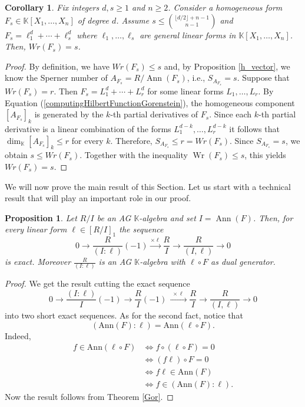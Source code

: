 \documentclass[12pt,twoside]{amsart}
\numberwithin{equation}{section} \hyphenation{semi-stable}
\newcommand{\K}{\mathbb{K}}
\DeclareMathOperator{\ann}{Ann}
\newtheorem{corollary}[theorem]{Corollary}
\newtheorem{proposition}[theorem]{Proposition}
\theoremstyle{definition}
\begin{document}
\begin{corollary} Fix integers $d,s\ge 1$ and $n\ge 2$. Consider a homogeneous form $F_s\in \K[X_1,\ldots ,X_n]$ of degree $d$. Assume $s\le {\lfloor d/2 \rfloor+n-1\choose n-1}$ and  $F_s=\ell_1^d+\cdots +\ell_s^d$ where $\ell_1, \ldots ,\ell_s$ are general linear forms in $\K[X_1,\ldots ,X_n]$. Then,  
    $Wr(F_s)=s$.
\end{corollary}
\begin{proof}  By definition,  we  have $Wr(F_{s}) \le s$ and, by Proposition \ref{h_vector}, we know the Sperner number of $A_{F_s}=R/\ann(F_s)$, i.e., $S_{A_{F_s}}=s$.  Suppose that $W r\left(F_s\right)=r$. Then $F_s=L_1^d+\cdots+L_r^d$ for some linear forms $L_1, \ldots, L_r$. By Equation (\ref{computingHilbertFunctionGorenstein}), the homogeneous component $\left[A_{F_s}\right]_k$ is generated by the $k$-th partial derivatives of $F_s$. Since each $k$-th partial derivative is a linear combination of the forms $L_1^{d-k}, \ldots, L_r^{d-k}$ it follows that $\operatorname{dim}_{\mathbb{K}}\left[A_{F_s}\right]_k \leq r$ for every $k.$ Therefore, $S_{A_{F_s}} \leq r=W r\left(F_s\right).$ Since $S_{A_{F_s}}=s$, we obtain $s \leq W r\left(F_s\right).$ Together with the inequality $\operatorname{Wr}\left(F_s\right) \leq s$, this yields
$W r\left(F_s\right) = s$.
\end{proof}



We will now prove the main result of this Section. Let us start with a technical result that will play an important role in our proof.

\begin{proposition}
\label{exactsequence}
Let $R/I$ be an AG $\K$-algebra and set $I=\operatorname{Ann}(F)$. Then, for every linear form $\ell\in [R/I]_1$ the sequence
\begin{equation}
\label{seq}
0\longrightarrow \frac{R}{(I:\ell)}(-1)\xrightarrow[]{\times\ell} \frac{R}{I}\longrightarrow \frac{R}{(I,\ell)}\longrightarrow 0
\end{equation}
is exact. Moreover $\frac{R}{(I:\ell)}$ is an AG $\K$-algebra with $\ell\circ F$ as dual generator.
\end{proposition}
\begin{proof}
We get the result cutting the exact sequence
\[
0\longrightarrow \frac{(I:\ell)}{I}(-1)
\longrightarrow \frac{R}{I}(-1)\xrightarrow{\,\,\,\times\ell\,\,\,}\frac{R}{I}\longrightarrow \frac{R}{(I,\ell)}\longrightarrow 0
\]
into two short exact sequences. As for the second fact, notice that 
$$
(\text{Ann}(F) : \ell)=\text{Ann}(\ell\circ F).
$$
Indeed,
\begin{align*}
    f\in \text{Ann}(\ell\circ F) &\iff f\circ(\ell\circ F)=0 \\
                           &\iff (f\ell)\circ F=0 \\
                           &\iff f\ell \in \text{Ann}(F) \\
                           &\iff f\in (\text{Ann}(F) : \ell).
\end{align*}
Now the result follows from Theorem \ref{Gor}.
\end{proof}
\end{document}
